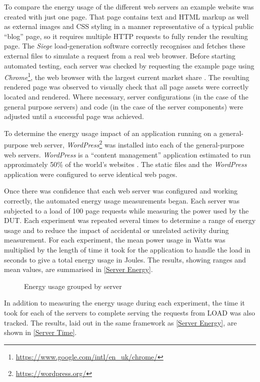 To compare the energy usage of the different web servers an example website was created with just one page. That page contains text and HTML markup as well as external images and CSS styling in a manner representative of a typical public \enquote{blog} page, so it requires multiple HTTP requests to fully render the resulting page. The \emph{Siege} load-generation software correctly recognises and fetches these external files to simulate a request from a real web browser. Before starting automated testing, each server was checked by requesting the example page using \emph{Chrome}\footnote{\url{https://www.google.com/intl/en_uk/chrome/}}, the web browser with the largest current market share \citep{StatistaBrowsers}. The resulting rendered page was observed to visually check that all page assets were correctly located and rendered. Where necessary, server configurations (in the case of the general purpose servers) and code (in the case of the server components) were adjusted until a successful page was achieved.

To determine the energy usage impact of an application running on a general-purpose web server, \emph{WordPress}\footnote{\url{https://wordpress.org/}} was installed into each of the general-purpose web servers. \emph{WordPress} is a \enquote{content management} application \citep{Patel2011a} estimated to run approximately 50\% of the world's websites \citep{W3Techs2022b}. The static files and the \emph{WordPress} application were configured to serve identical web pages. 

Once there was confidence that each web server was configured and working correctly, the automated energy usage measurements began. Each server was subjected to a load of 100 page requests while measuring the power used by the DUT. Each experiment was repeated several times to determine a range of energy usage and to reduce the impact of accidental or unrelated activity during measurement. For each experiment, the mean power usage in Watts was multiplied by the length of time it took for the application to handle the load in seconds to give a total energy usage in Joules. The results, showing ranges and mean values, are summarised in \autoref{Server Energy}.

\begin{figure}[htbp]
  \centering
  
  \caption{Energy usage grouped by server}
  \label{Server Energy}
\end{figure}

In addition to measuring the energy usage during each experiment, the time it took for each of the servers to complete serving the requests from LOAD was also tracked. The results, laid out in the same framework as \autoref{Server Energy}, are shown in \autoref{Server Time}.

